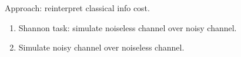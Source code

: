 Approach: reinterpret classical info cost.
\begin{enumerate}
\item
Shannon task: simulate noiseless channel over noisy channel.
\item
Simulate noisy channel over noiseless channel.
\end{enumerate}



